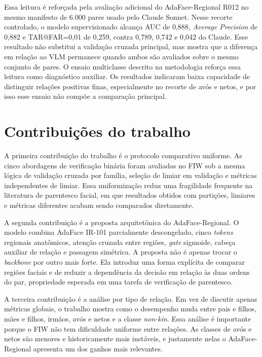Essa leitura é reforçada pela avaliação adicional do AdaFace-Regional R012 no mesmo manifesto de 6.000 pares usado pelo Claude Sonnet. Nesse recorte controlado, o modelo supervisionado alcança AUC de 0,888, \textit{Average Precision} de 0,882 e TAR@FAR=0{,}01 de 0,259, contra 0,789, 0,742 e 0,042 do Claude. Esse resultado não substitui a validação cruzada principal, mas mostra que a diferença em relação ao VLM permanece quando ambos são avaliados sobre o mesmo conjunto de pares. O ensaio multiclasse descrito na metodologia reforça essa leitura como diagnóstico auxiliar. Os resultados indicaram baixa capacidade de distinguir relações positivas finas, especialmente no recorte de avós e netos, e por isso esse ensaio não compõe a comparação principal.

\section{Contribuições do trabalho}

A primeira contribuição do trabalho é o protocolo comparativo uniforme. As cinco abordagens de verificação binária foram avaliadas no FIW sob a mesma lógica de validação cruzada por família, seleção de limiar em validação e métricas independentes de limiar. Essa uniformização reduz uma fragilidade frequente na literatura de parentesco facial, em que resultados obtidos com partições, limiares e métricas diferentes acabam sendo comparados diretamente.

A segunda contribuição é a proposta arquitetônica do AdaFace-Regional. O modelo combina AdaFace IR-101 parcialmente descongelado, cinco \textit{tokens} regionais anatômicos, atenção cruzada entre regiões, \textit{gate} sigmoide, cabeça auxiliar de relação e passagem simétrica. A proposta não é apenas trocar o \textit{backbone} por outro mais forte. Ela introduz uma forma explícita de comparar regiões faciais e de reduzir a dependência da decisão em relação às duas ordens do par, propriedade esperada em uma tarefa de verificação de parentesco.

A terceira contribuição é a análise por tipo de relação. Em vez de discutir apenas métricas globais, o trabalho mostra como o desempenho muda entre pais e filhos, mães e filhos, irmãos, avós e netos e a classe \textit{non-kin}. Essa análise é importante porque o FIW não tem dificuldade uniforme entre relações. As classes de avós e netos são menores e historicamente mais instáveis, e justamente nelas o AdaFace-Regional apresenta um dos ganhos mais relevantes.

